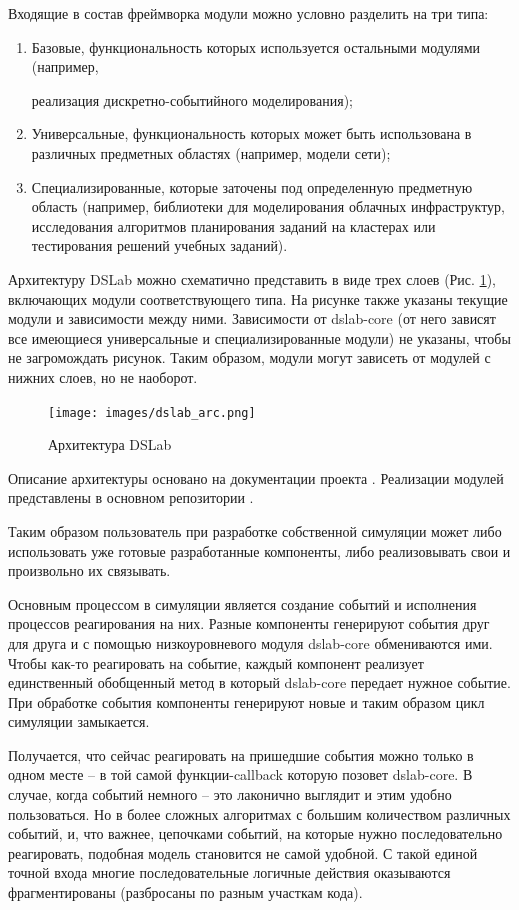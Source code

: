 Входящие в состав фреймворка модули можно условно разделить на три типа:
\begin{enumerate}
    \item 
    Базовые, функциональность которых используется остальными модулями (например, 
    
    реализация дискретно-событийного моделирования);
    \item
    Универсальные, функциональность которых может быть использована в различных предметных областях (например, модели сети);
    \item
    Специализированные, которые заточены под определенную предметную область (например, библиотеки для моделирования облачных инфраструктур, исследования алгоритмов планирования заданий на кластерах или тестирования решений учебных заданий).
\end{enumerate}

Архитектуру DSLab можно схематично представить в виде трех слоев (Рис. \ref{dslab_arc}), включающих модули соответствующего типа. На рисунке также указаны текущие модули и зависимости между ними. Зависимости от dslab-core (от него зависят все имеющиеся универсальные и специализированные модули) не указаны, чтобы не загромождать рисунок. Таким образом, модули могут зависеть от модулей с нижних слоев, но не наоборот.

\begin{figure}[H]
    \centering
    \texttt{[image: images/dslab\_arc.png]}
    \caption{Архитектура DSLab}
    \label{dslab_arc}
\end{figure}

Описание архитектуры основано на документации проекта \cite{dslab-architecture}.  Реализации модулей представлены в основном репозитории \cite{dslab-repo}.

Таким образом пользователь при разработке собственной симуляции может либо использовать уже готовые разработанные компоненты, либо реализовывать свои и произвольно их связывать. 

Основным процессом в симуляции является создание событий и исполнения процессов реагирования на них. Разные компоненты генерируют события друг для друга и с помощью низкоуровневого модуля dslab-core обмениваются ими. Чтобы как-то реагировать на событие, каждый компонент реализует единственный обобщенный метод в который dslab-core передает нужное событие. При обработке события компоненты генерируют новые и таким образом цикл симуляции замыкается. 

Получается, что сейчас реагировать на пришедшие события можно только в одном месте -- в той самой функции-callback которую позовет dslab-core. В случае, когда событий немного -- это лаконично выглядит и этим удобно пользоваться. Но в более сложных алгоритмах с большим количеством различных событий, и, что важнее, цепочками событий, на которые нужно последовательно реагировать, подобная модель становится не самой удобной. С такой единой точной входа многие последовательные логичные действия оказываются фрагментированы (разбросаны по разным участкам кода). 

